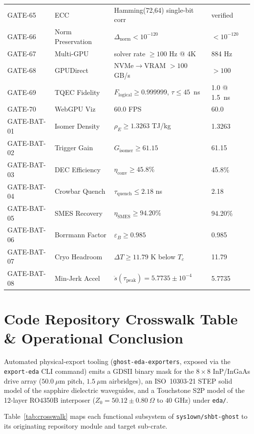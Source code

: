 \documentclass[twocolumn,aps,pra,floatfix,superscriptaddress,10pt]{revtex4-2}
\begin{document}
\begin{longtable}{llll}
GATE-65 & ECC & Hamming(72,64) single-bit corr & verified \\
GATE-66 & Norm Preservation & $\Delta_{\text{norm}} < 10^{-120}$ & $<10^{-120}$ \\
GATE-67 & Multi-GPU & solver rate $\ge 100$ Hz @ 4K & 884 Hz \\
GATE-68 & GPUDirect & NVMe$\to$VRAM $> 100$ GB/s & $>100$ \\
GATE-69 & TQEC Fidelity & $F_{\text{logical}} \ge 0.999999$, $\tau \le 45$~ns & 1.0 @ 1.5~ns \\
GATE-70 & WebGPU Viz & $60.0$ FPS & 60.0 \\
GATE-BAT-01 & Isomer Density & $\rho_E \ge 1.3263$ TJ/kg & 1.3263 \\
GATE-BAT-02 & Trigger Gain & $G_{\text{isomer}} \ge 61.15$ & 61.15 \\
GATE-BAT-03 & DEC Efficiency & $\eta_{\text{conv}} \ge 45.8\%$ & 45.8\% \\
GATE-BAT-04 & Crowbar Quench & $\tau_{\text{quench}} \le 2.18$ ns & 2.18 \\
GATE-BAT-05 & SMES Recovery & $\eta_{\text{SMES}} \ge 94.20\%$ & 94.20\% \\
GATE-BAT-06 & Borrmann Factor & $\varepsilon_B \ge 0.985$ & 0.985 \\
GATE-BAT-07 & Cryo Headroom & $\Delta T \ge 11.79$ K below $T_c$ & 11.79 \\
GATE-BAT-08 & Min-Jerk Accel & $\ddot{s}(\tau_{\text{peak}}) = 5.7735 \pm 10^{-4}$ & 5.7735 \\
\bottomrule
\end{longtable}
\twocolumngrid

\section{Code Repository Crosswalk Table \& Operational Conclusion}

Automated physical-export tooling (\texttt{ghost-eda-exporters}, exposed via the \texttt{export-eda} CLI command) emits a GDSII binary mask for the $8\times8$ InP/InGaAs drive array ($50.0\ \mu\text{m}$ pitch, $1.5\ \mu\text{m}$ airbridges), an ISO~10303-21 STEP solid model of the sapphire dielectric waveguides, and a Touchstone S2P model of the 12-layer RO4350B interposer ($Z_0 = 50.12 \pm 0.80\ \Omega$ to $40\text{ GHz}$) under \texttt{eda/}.

Table~\ref{tab:crosswalk} maps each functional subsystem of \texttt{sys1own/shbt-ghost} to its originating repository module and target sub-crate.
\end{document}
